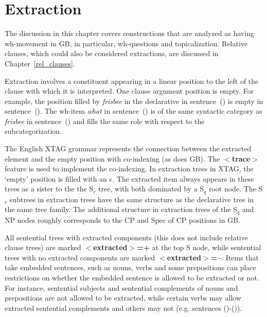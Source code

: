 \chapter{Extraction}
\label{extraction}

The discussion in this chapter covers constructions that are analyzed
as having wh-movement in GB, in particular, wh-questions and
topicalization. Relative clauses, which could also be considered
extractions, are discussed in Chapter~\ref{rel_clauses}.

Extraction involves a constituent appearing in a linear position to the left of
the clause with which it is interpreted. One clause argument position is
empty. For example, the position filled by {\it frisbee} in the declarative in
sentence~() is empty in sentence~(). The wh-item {\it what} in
sentence~() is of the same syntactic category as {\it frisbee} in
sentence~() and fills the same role with respect to the
subcategorization.



The English XTAG grammar represents the connection between the extracted
element and the empty position with co-indexing (as does GB).  The {\bf
$<$trace$>$} feature is used to implement the co-indexing.  In extraction trees
in XTAG, the `empty' position is filled with an {\it $\epsilon$}.  The
extracted item always appears in these trees as a sister to the the S$_{r}$
tree, with both dominated by a S$_{q}$ root node.  The S$_{r}$ subtrees in
extraction trees have the same structure as the declarative tree in the same
tree family.  The additional structure in extraction trees of the S$_{q}$ and
NP nodes roughly corresponds to the CP and Spec of CP positions in GB.

All sentential trees with extracted components (this does not include relative
clause trees) are marked {\bf $<$extracted$>$=+} at the top S node, while
sentential trees with no extracted components are marked {\bf
$<$extracted$>$=--}.  Items that take embedded sentences, such as nouns, verbs
and some prepositions can place restrictions on whether the embedded sentence
is allowed to be extracted or not.  For instance, sentential subjects and
sentential complements of nouns and prepositions are not allowed to be
extracted, while certain verbs may allow extracted sentential complements and
others may not (e.g. sentences ()-()).


